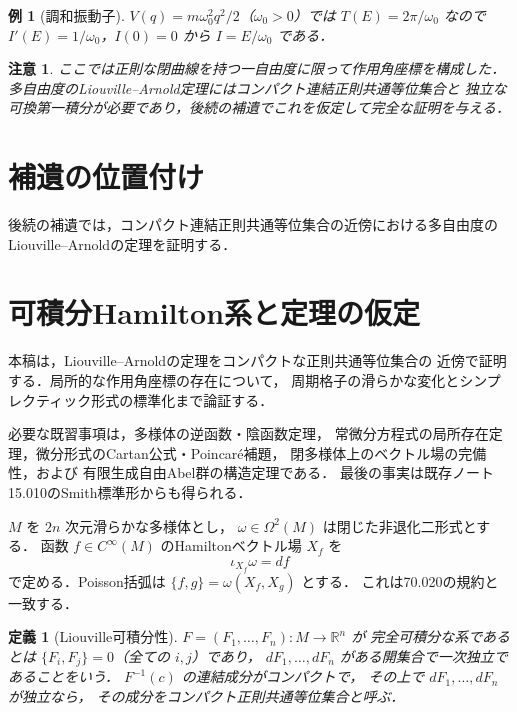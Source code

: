 \documentclass[a5paper,10pt,onecolumn]{jsarticle}
\theoremstyle{mathnotetheorem}
\newtheorem{definition}[theorem]{定義}
\newtheorem{example}[theorem]{例}
\newtheorem{remark}[theorem]{注意}
\begin{document}
\begin{example}[調和振動子]
$V(q)=m\omega_0^2q^2/2$（$\omega_0>0$）では
$T(E)=2\pi/\omega_0$ なので
$I'(E)=1/\omega_0$，$I(0)=0$ から $I=E/\omega_0$ である．
\end{example}
\begin{remark}
ここでは正則な閉曲線を持つ一自由度に限って作用角座標を構成した．
多自由度のLiouville--Arnold定理にはコンパクト連結正則共通等位集合と
独立な可換第一積分が必要であり，後続の補遺でこれを仮定して完全な証明を与える．
\end{remark}



\section{補遺の位置付け}
後続の補遺では，コンパクト連結正則共通等位集合の近傍における多自由度のLiouville--Arnoldの定理を証明する．

\section{可積分Hamilton系と定理の仮定}
本稿は，Liouville--Arnoldの定理をコンパクトな正則共通等位集合の
近傍で証明する．局所的な作用角座標の存在について，
周期格子の滑らかな変化とシンプレクティック形式の標準化まで論証する．

必要な既習事項は，多様体の逆函数・陰函数定理，
常微分方程式の局所存在定理，微分形式のCartan公式・Poincar\'e補題，
閉多様体上のベクトル場の完備性，および
有限生成自由Abel群の構造定理である．
最後の事実は既存ノート15.010のSmith標準形からも得られる．

$M$ を $2n$ 次元滑らかな多様体とし，
$\omega\in\Omega^2(M)$ は閉じた非退化二形式とする．
函数 $f\in C^\infty(M)$ のHamiltonベクトル場 $X_f$ を
\[
 \iota_{X_f}\omega=df
\]
で定める．Poisson括弧は
$\{f,g\}=\omega(X_f,X_g)$ とする．
これは70.020の規約と一致する．

\begin{definition}[Liouville可積分性]
$F=(F_1,\ldots,F_n):M\to\mathbb R^n$ が
\emph{完全可積分な系}であるとは
$\{F_i,F_j\}=0$（全ての $i,j$）であり，
$dF_1,\ldots,dF_n$ がある開集合で一次独立であることをいう．
$F^{-1}(c)$ の連結成分がコンパクトで，
その上で $dF_1,\ldots,dF_n$ が独立なら，
その成分をコンパクト正則共通等位集合と呼ぶ．
\end{definition}
\end{document}
